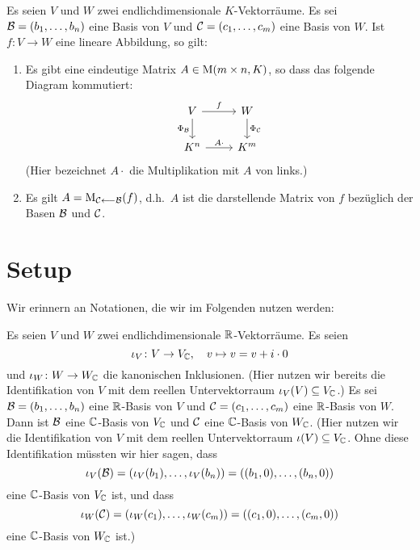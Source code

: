 \documentclass[a4paper,10pt]{article}
\begin{document}
\begin{lemma}
  Es seien $V$ und $W$ zwei endlichdimensionale $K$-Vektorräume.
  Es sei $\mathcal{B} = (b_1, \dotsc, b_n)$ eine Basis von $V$ und $\mathcal{C} = (c_1, \dotsc, c_m)$ eine Basis von $W$.
  Ist $f \colon V \to W$ eine lineare Abbildung, so gilt:
  \begin{enumerate}
  
    \item
      Es gibt eine eindeutige Matrix $A \in \operatorname{M}(m \times n, K)$, so dass das folgende Diagram kommutiert:
      \[
        \begin{tikzcd}
            V \arrow[r, "f"] \arrow[d, "\Phi_\mc{B}"']
          & W \arrow[d, "\Phi_\mc{C}"]
          \\
            {K^n} \arrow[r, "A \cdot"]
          & {K^m}
        \end{tikzcd}
      \]
      (Hier bezeichnet $A \cdot$ die Multiplikation mit $A$ von links.)
    
    \item
      Es gilt $A = \operatorname{M}_{\mathcal{C} \longleftarrow \mathcal{B}}(f)$, d.h.\ $A$ ist die darstellende Matrix von $f$ bezüglich der Basen $\mathcal{B}$ und $\mathcal{C}$.
  \end{enumerate}
\end{lemma}



\section{Setup}

Wir erinnern an Notationen, die wir im Folgenden nutzen werden:

Es seien $V$ und $W$ zwei endlichdimensionale $\mathbb{R}$-Vektorräume.
Es seien
\[
  \iota_V \colon V \to V_{\mathbb{C}},
  \quad
  v \mapsto v = v + i \cdot 0
\]
und $\iota_W \colon W \to W_{\mathbb{C}}$ die kanonischen Inklusionen.
(Hier nutzen wir bereits die Identifikation von $V$ mit dem reellen Untervektorraum $\iota_V(V) \subseteq V_{\mathbb{C}}$.)
Es sei $\mathcal{B} = (b_1, \dotsc, b_n)$ eine $\mathbb{R}$-Basis von $V$ und $\mathcal{C} = (c_1, \dotsc, c_m)$ eine $\mathbb{R}$-Basis von $W$.
Dann ist $\mathcal{B}$ eine $\mathbb{C}$-Basis von $V_{\mathbb{C}}$ und $\mathcal{C}$ eine $\mathbb{C}$-Basis von $W_{\mathbb{C}}$.
(Hier nutzen wir die Identifikation von $V$ mit dem reellen Untervektorraum $\iota(V) \subseteq V_{\mathbb{C}}$.
Ohne diese Identifikation müssten wir hier sagen, dass
\[
    \iota_V(\mathcal{B})
  = (\iota_V(b_1), \dotsc, \iota_V(b_n))
  = ((b_1, 0), \dotsc, (b_n, 0))
\]
eine $\mathbb{C}$-Basis von $V_{\mathbb{C}}$ ist, und dass
\[
    \iota_W(\mathcal{C})
  = (\iota_W(c_1), \dotsc, \iota_W(c_m))
  = ((c_1, 0), \dotsc, (c_m, 0))
\]
eine $\mathbb{C}$-Basis von $W_{\mathbb{C}}$ ist.)
\end{document}
